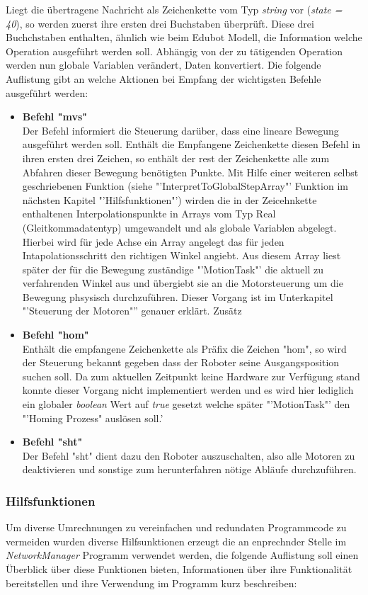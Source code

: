 Liegt die übertragene Nachricht als Zeichenkette vom Typ \textit{string} vor (\textit{state = 40}), so werden zuerst ihre ersten drei Buchstaben überprüft. Diese drei Buchchstaben enthalten, ähnlich wie beim Edubot Modell, die Information welche Operation ausgeführt werden soll. 
Abhängig von der zu tätigenden Operation werden nun globale Variablen verändert, Daten konvertiert. Die folgende Auflistung gibt an welche Aktionen bei Empfang der wichtigsten Befehle ausgeführt werden:

\begin{itemize}
\item \textbf{Befehl "mvs"}\\
Der Befehl informiert die Steuerung darüber, dass eine lineare Bewegung ausgeführt werden soll. Enthält die Empfangene Zeichenkette diesen Befehl in ihren ersten drei Zeichen, so enthält der rest der Zeichenkette alle zum Abfahren dieser Bewegung benötigten Punkte.
Mit Hilfe einer weiteren selbst geschriebenen Funktion (siehe "'InterpretToGlobalStepArray"' Funktion im nächsten Kapitel "'Hilfsfunktionen"') wirden die in der Zeicehnkette enthaltenen Interpolationspunkte in Arrays vom Typ Real (Gleitkommadatentyp) umgewandelt und als globale Variablen abgelegt. Hierbei wird für jede Achse ein Array angelegt das für jeden Intapolationsschritt den richtigen Winkel angiebt. Aus diesem Array liest später der für die Bewegung zuständige "'MotionTask"' die aktuell zu verfahrenden Winkel aus und übergiebt sie an die Motorsteuerung um die Bewegung phsysisch durchzuführen. Dieser Vorgang ist im Unterkapitel "'Steuerung der Motoren"'' genauer erklärt. Zusätz
\item \textbf{Befehl "hom"}\\
Enthält die empfangene Zeichenkette als Präfix die Zeichen "hom", so wird der Steuerung bekannt gegeben dass der Roboter seine Ausgangsposition suchen soll. Da zum aktuellen Zeitpunkt keine Hardware zur Verfügung stand konnte dieser Vorgang nicht implementiert werden und es wird hier lediglich ein globaler \textit{boolean} Wert auf \textit{true} gesetzt welche später "'MotionTask"' den "'Homing Prozess" auslösen soll.'
\item \textbf{Befehl "sht"}\\
Der Befehl "sht" dient dazu den Roboter auszuschalten, also alle Motoren zu deaktivieren und sonstige zum herunterfahren nötige Abläufe durchzuführen. 
\end{itemize}

\subsubsection{Hilfsfunktionen}
Um diverse Umrechnungen zu vereinfachen und redundaten Programmcode zu vermeiden wurden diverse Hilfsunktionen erzeugt die an enprechnder Stelle im\textit{ NetworkManager} Programm verwendet werden, die folgende Auflistung soll einen Überblick über diese Funktionen bieten, Informationen über ihre Funktionalität bereitstellen und ihre Verwendung im Programm kurz beschreiben:

